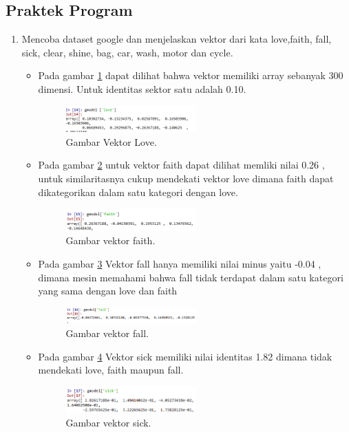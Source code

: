 \subsection{Praktek Program}
\begin{enumerate}
\item Mencoba dataset google dan menjelaskan vektor dari kata love,faith, fall, sick, clear, shine, bag, car, wash, motor dan cycle. 
\begin{itemize}	
\item Pada gambar \ref{1love} dapat dilihat bahwa vektor memiliki array sebanyak 300 dimensi. Untuk identitas sektor satu adalah 0.10.  
	\begin{figure}[ht]
	\centerline{\includegraphics[width=0.5\textwidth]{figures/chapter5/1love.png}}
	\caption{Gambar Vektor Love.}	
	\label{1love}
	\end{figure}


\item Pada gambar \ref{2faith} untuk vektor faith dapat dilihat memliki nilai 0.26 , untuk similaritasnya cukup mendekati vektor love dimana faith dapat dikategorikan dalam satu kategori dengan love.
	\begin{figure}[ht]
	\centerline{\includegraphics[width=0.5\textwidth]{figures/chapter5/2faith.png}}
	\caption{Gambar vektor faith.}	
	\label{2faith}
	\end{figure}


\item Pada gambar \ref{3fall} Vektor fall hanya memiliki nilai minus yaitu -0.04 , dimana mesin memahami bahwa fall tidak terdapat dalam satu kategori yang sama dengan love dan faith
	\begin{figure}[ht]
	\centerline{\includegraphics[width=0.5\textwidth]{figures/chapter5/3fall.png}}
	\caption{Gambar vektor fall.}	
	\label{3fall}
	\end{figure}


\item  Pada gambar \ref{4sick} Vektor sick memiliki nilai identitas 1.82 dimana tidak mendekati love, faith maupun fall.
	\begin{figure}[ht]
	\centerline{\includegraphics[width=0.5\textwidth]{figures/chapter5/4sick.png}}
	\caption{Gambar vektor sick.}	
	\label{4sick}
	\end{figure}



\end{itemize}
\end{enumerate}
